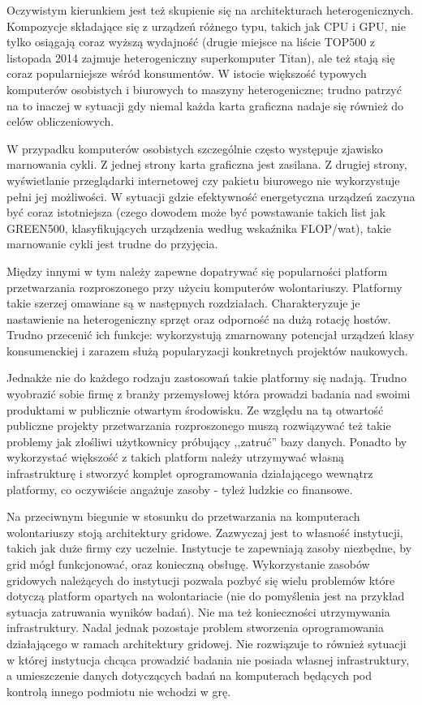 \documentclass[12pt,a4paper,twoside]{article}
\begin{document}
Oczywistym kierunkiem jest też skupienie się na architekturach heterogenicznych. Kompozycje składające się z urządzeń różnego typu, takich jak CPU i GPU, nie tylko osiągają coraz wyższą wydajność (drugie miejsce na liście TOP500 z listopada 2014 \cite{top500} zajmuje heterogeniczny superkomputer Titan), ale też stają się coraz popularniejsze wśród konsumentów. W istocie większość typowych komputerów osobistych i biurowych to maszyny heterogeniczne; trudno patrzyć na to inaczej w sytuacji gdy niemal każda karta graficzna nadaje się również do celów obliczeniowych.

W przypadku komputerów osobistych szczególnie często występuje zjawisko marnowania cykli. Z jednej strony karta graficzna jest zasilana. Z drugiej strony, wyświetlanie przeglądarki internetowej czy pakietu biurowego nie wykorzystuje pełni jej możliwości. W sytuacji gdzie efektywność energetyczna urządzeń zaczyna być coraz istotniejsza (czego dowodem może być powstawanie takich list jak GREEN500, klasyfikujących urządzenia według wskaźnika FLOP/wat), takie marnowanie cykli jest trudne do przyjęcia.

Między innymi w tym należy zapewne dopatrywać się popularności platform przetwarzania rozproszonego przy użyciu komputerów wolontariuszy. Platformy takie szerzej omawiane są w następnych rozdziałach. Charakteryzuje je nastawienie na heterogeniczny sprzęt oraz odporność na dużą rotację hostów. Trudno przecenić ich funkcje: wykorzystują zmarnowany potencjał urządzeń klasy konsumenckiej i zarazem służą popularyzacji konkretnych projektów naukowych. 

Jednakże nie do każdego rodzaju zastosowań takie platformy się nadają. Trudno wyobrazić sobie firmę z branży przemysłowej która prowadzi badania nad swoimi produktami w publicznie otwartym środowisku. Ze względu na tą otwartość publiczne projekty przetwarzania rozproszonego muszą rozwiązywać też takie problemy jak złośliwi użytkownicy próbujący ,,zatruć'' bazy danych. Ponadto by wykorzystać większość z takich platform należy utrzymywać własną infrastrukturę i stworzyć komplet oprogramowania działającego wewnątrz platformy, co oczywiście angażuje zasoby - tyleż ludzkie co finansowe.

Na przeciwnym biegunie w stosunku do przetwarzania na komputerach wolontariuszy stoją architektury gridowe. Zazwyczaj jest to własność instytucji, takich jak duże firmy czy uczelnie. Instytucje te zapewniają zasoby niezbędne, by grid mógł funkcjonować, oraz konieczną obsługę. Wykorzystanie zasobów gridowych należących do instytucji pozwala pozbyć się wielu problemów które dotyczą platform opartych na wolontariacie (nie do pomyślenia jest na przykład sytuacja zatruwania wyników badań). Nie ma też konieczności utrzymywania infrastruktury. Nadal jednak pozostaje problem stworzenia oprogramowania działającego w ramach architektury gridowej. Nie rozwiązuje to również sytuacji w której instytucja chcąca prowadzić badania nie posiada własnej infrastruktury, a umieszczenie danych dotyczących badań na komputerach będących pod kontrolą innego podmiotu nie wchodzi w grę.
\end{document}
